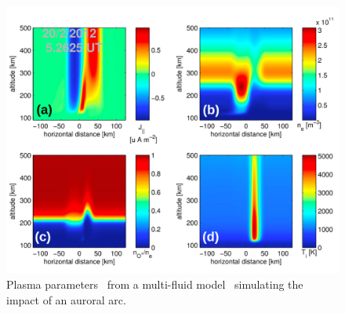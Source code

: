 \begin{figure}[!t]
\centering
\includegraphics[width=5.0in]{MZsim}
\caption{Plasma parameters~\cite{Perry:2015jf} from a multi-fluid model~\cite{semeter:plasmatransport2012} simulating the impact of an auroral arc. }
\label{fig:mzsim}
\end{figure}

